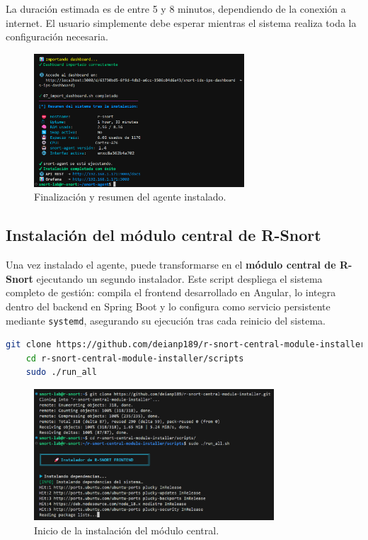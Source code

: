 \documentclass[11pt,a4paper,twoside]{report}
\begin{document}
La duración estimada es de entre 5 y 8 minutos, dependiendo de la conexión a internet. El usuario simplemente debe esperar mientras el sistema realiza toda la configuración necesaria.

\begin{figure}[H]
	\centering
	\includegraphics[width=0.7\textwidth]{install/5.png}
	\caption{Finalización y resumen del agente instalado.}
	\label{fig:resumen-snort-agent}
\end{figure}


\subsection{Instalación del módulo central de R-Snort}

Una vez instalado el agente, puede transformarse en el \textbf{módulo central de R-Snort} ejecutando un segundo instalador. Este script despliega el sistema completo de gestión: compila el frontend desarrollado en Angular, lo integra dentro del backend en Spring Boot y lo configura como servicio persistente mediante \texttt{systemd}, asegurando su ejecución tras cada reinicio del sistema.

\begin{lstlisting}[language=bash, caption={Comandos de instalación del agente}, label={lst:instalacion-snort-agent}]
	git clone https://github.com/deianp189/r-snort-central-module-installer.git
	cd r-snort-central-module-installer/scripts
	sudo ./run_all
\end{lstlisting}

\begin{figure}[H]
	\centering
	\includegraphics[width=0.8\textwidth]{install/6.png}
	\caption{Inicio de la instalación del módulo central.}
	\label{fig:inicio-central-module}
\end{figure}
\end{document}
